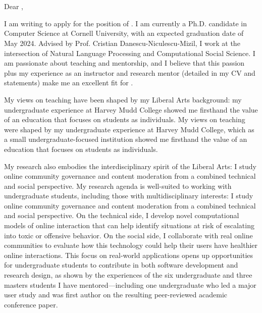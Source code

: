 \documentclass[12pt]{letter}
\begin{document}
\signature{Jonathan P. Chang}
\begin{letter}{
\department \\
\schoolnamelong \\
\schooladdress
}

\opening{
    Dear ,
}

I am writing to apply for the position of \position.
I am currently a Ph.D. candidate in Computer Science at Cornell University, with an expected graduation date of May 2024.
Advised by Prof. Cristian Danescu-Niculescu-Mizil, I work at the intersection of Natural Language Processing and Computational Social Science.
I am passionate about teaching and mentorship, and I believe that this passion plus my experience as an instructor and research mentor (detailed in my CV and statements) make me an excellent fit for \schoolname.

\ifliberalarts
My views on teaching have been shaped by my Liberal Arts background: my undergraduate experience at Harvey Mudd College showed me firsthand the value of an education that focuses on students as individuals.
\else
My views on teaching were shaped by my undergraduate experience at Harvey Mudd College, which as a small undergraduate-focused institution showed me firsthand the value of an education that focuses on students as individuals.
\fi
\coverteachingpara

\ifliberalarts
My research also embodies the interdisciplinary spirit of the Liberal Arts: I study online community governance and content moderation from a combined technical and social perspective.
\else
My research agenda is well-suited to working with undergraduate students, including those with multidisciplinary interests: I study online community governance and content moderation from a combined technical and social perspective.
\fi
On the technical side, I develop novel computational models of online interaction that can help identify situations at risk of escalating into toxic or offensive behavior.
On the social side, I collaborate with real online communities to evaluate how this technology could help their users have healthier online interactions.
This focus on real-world applications opens up opportunities for undergraduate students to contribute in both software development and research design, as shown by the experiences of the six undergraduate and three masters students I have mentored---including one undergraduate who led a major user study and was first author on the resulting peer-reviewed academic conference paper.
\coverresearchpara


\end{letter}
\end{document}

